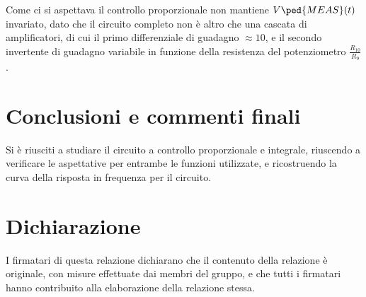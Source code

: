 \documentclass[10pt, a4paper, italian]{article}
\begin{document}
Come ci si aspettava il controllo proporzionale non mantiene $V\ped{MEAS} (t)$
invariato, dato che il circuito completo non è altro che una cascata di
amplificatori, di cui il primo differenziale di guadagno $\approx 10$, e
il secondo invertente di guadagno variabile in funzione della resistenza del
potenziometro $\frac{R_{10}}{R_9}$.
\section*{Conclusioni e commenti finali}
Si è riusciti a studiare il circuito a controllo proporzionale e integrale, riuscendo a verificare le aspettative per entrambe le funzioni utilizzate, e ricostruendo la curva della risposta in frequenza per il circuito.
\section*{Dichiarazione}
I firmatari di questa relazione dichiarano che il contenuto della relazione \`e
originale, con misure effettuate dai membri del gruppo, e che tutti i firmatari
hanno contribuito alla elaborazione della relazione stessa.
\end{document}
